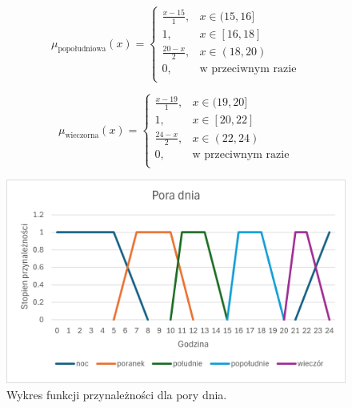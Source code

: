 \documentclass{article}
\begin{document}
\begin{enumerate}
        \begin{equation}
            \mu_{\text{popołudniowa}}(x) =
            \begin{cases}
            \frac{x - 15}{1}, & x \in (15, 16] \\
            1, & x \in [16, 18] \\
            \frac{20 - x}{2}, & x \in (18, 20) \\
            0, & \text{w przeciwnym razie} \\
             \end{cases}
        \end{equation}

        \begin{equation}
            \mu_{\text{wieczorna}}(x) =
            \begin{cases}
            \frac{x - 19}{1}, & x \in (19, 20] \\
            1, & x \in [20, 22] \\
            \frac{24 - x}{2}, & x \in (22, 24) \\
            0, & \text{w przeciwnym razie} \\
            \end{cases}
        \end{equation} 
        
    \begin{figure}[H]
    \centering
    \includegraphics[width=\textwidth]{img/day.png}
    \caption{Wykres funkcji przynależności dla pory dnia.}
    \end{figure}
    

\end{enumerate}
\end{document}
